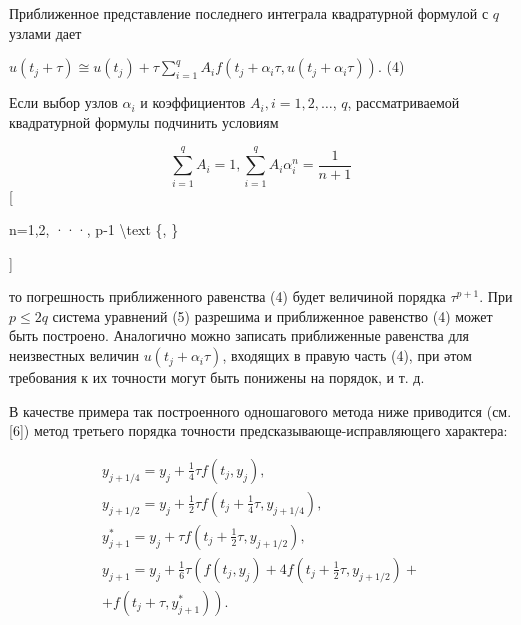 \documentclass[10pt]{article}
\begin{document}
Приближенное представление последнего интеграла квадратурной формулой с $q$ узлами дает



$u\left(t_{j}+\tau\right) \cong u\left(t_{j}\right)+\tau \sum_{i=1}^{q} A_{i} f\left(t_{j}+\alpha_{i} \tau, u\left(t_{j}+\alpha_{i} \tau\right)\right)$. (4)



Если выбор узлов $\alpha_{i}$ и коэффициентов $A_{i}, i=1,2, \ldots$, $q$, рассматриваемой квадратурной формулы подчинить условиям



\[

\sum_{i=1}^{q} A_{i}=1, \sum_{i=1}^{q} A_{i} \alpha_{i}^{n}=\frac{1}{n+1}

\][



n=1,2, ···, p-1 \textbackslash text \{, \}

]



то погрешность приближенного равенства (4) будет величиной порядка $\tau^{p+1}$. При $p \leqslant 2 q$ система уравнений (5) разрешима и приближенное равенство (4) может быть построено. Аналогично можно записать приближенные равенства для неизвестных величин $u\left(t_{j}+\alpha_{i} \tau\right)$, входящих в правую часть (4), при әтом требования к их точности могут быть понижены на порядок, и т. д.



В качестве примера так построенного одношагового метода ниже приводится (см. [6]) метод третьего порядка точности предсказывающе-исправляющего характера:



\[

\begin{gathered}

y_{j+1 / 4}=y_{j}+\frac{1}{4} \tau f\left(t_{j}, y_{j}\right), \\

y_{j+1 / 2}=y_{j}+\frac{1}{2} \tau f\left(t_{j}+\frac{1}{4} \tau, y_{j+1 / 4}\right), \\

y_{j+1}^{*}=y_{j}+\tau f\left(t_{j}+\frac{1}{2} \tau, y_{j+1 / 2}\right), \\

y_{j+1}=y_{j}+\frac{1}{6} \tau\left(f\left(t_{j}, y_{j}\right)+4 f\left(t_{j}+\frac{1}{2} \tau, y_{j+1 / 2}\right)+\right. \\

\left.+f\left(t_{j}+\tau, y_{j+1}^{*}\right)\right) .

\end{gathered}

\]
\end{document}
